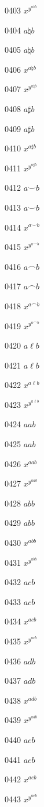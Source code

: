 \documentclass{article}
\begin{document}
0403 $x^{y^{a\flat b}}$\par
0404 $a\natural b$\par
0405 $\displaystyle a\natural b$\par
0406 $x^{a\natural b}$\par
0407 $x^{y^{a\natural b}}$\par
0408 $a\sharp b$\par
0409 $\displaystyle a\sharp b$\par
0410 $x^{a\sharp b}$\par
0411 $x^{y^{a\sharp b}}$\par
0412 $a\smile b$\par
0413 $\displaystyle a\smile b$\par
0414 $x^{a\smile b}$\par
0415 $x^{y^{a\smile b}}$\par
0416 $a\frown b$\par
0417 $\displaystyle a\frown b$\par
0418 $x^{a\frown b}$\par
0419 $x^{y^{a\frown b}}$\par
0420 $a\ell b$\par
0421 $\displaystyle a\ell b$\par
0422 $x^{a\ell b}$\par
0423 $x^{y^{a\ell b}}$\par
0424 $aab$\par
0425 $\displaystyle aab$\par
0426 $x^{aab}$\par
0427 $x^{y^{aab}}$\par
0428 $abb$\par
0429 $\displaystyle abb$\par
0430 $x^{abb}$\par
0431 $x^{y^{abb}}$\par
0432 $acb$\par
0433 $\displaystyle acb$\par
0434 $x^{acb}$\par
0435 $x^{y^{acb}}$\par
0436 $adb$\par
0437 $\displaystyle adb$\par
0438 $x^{adb}$\par
0439 $x^{y^{adb}}$\par
0440 $aeb$\par
0441 $\displaystyle aeb$\par
0442 $x^{aeb}$\par
0443 $x^{y^{aeb}}$\par
\end{document}
